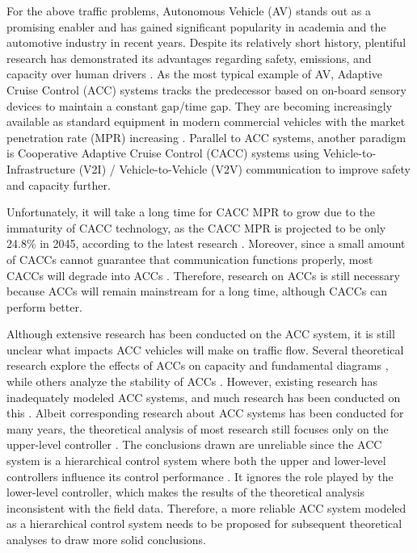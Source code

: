 \documentclass[journal]{IEEEtran}
\begin{document}
For the above traffic problems, Autonomous Vehicle (AV) stands out as a promising enabler and has gained significant popularity in academia and the automotive industry in recent years. Despite its relatively short history, plentiful research has demonstrated its advantages regarding safety, emissions, and capacity over human drivers \citep{Wang2019,Sarker2019,Dey2015}. As the most typical example of AV, Adaptive Cruise Control (ACC) systems tracks the predecessor based on on-board sensory devices to maintain a constant gap/time gap. They are becoming increasingly available as standard equipment in modern commercial vehicles with the market penetration rate (MPR) increasing \citep{Wilson2011}. Parallel to ACC systems, another paradigm is Cooperative Adaptive Cruise Control (CACC) systems using Vehicle-to-Infrastructure (V2I) / Vehicle-to-Vehicle (V2V) communication to improve safety and capacity further.

Unfortunately, it will take a long time for CACC MPR to grow due to the immaturity of CACC technology, as the CACC MPR is projected to be only 24.8\% in 2045, according to the latest research \citep{Bansal2017}. Moreover, since a small amount of CACCs cannot guarantee that communication functions properly, most CACCs will degrade into ACCs \citep{Wang2018,Ruan2021,Zhou2021}. Therefore, research on ACCs is still necessary because ACCs will remain mainstream for a long time, although CACCs can perform better.

Although extensive research has been conducted on the ACC system, it is still unclear what impacts ACC vehicles will make on traffic flow. Several theoretical research explore the effects of ACCs on capacity and fundamental diagrams \citep{Shang2021,Li2022,Ciuffo2021}, while others analyze the stability of ACCs \citep{Flores2018,Lee2021,Zhou2017}. However, existing research has inadequately modeled ACC systems, and much research has been conducted on this \citep{Gunter2019,Shang2022,Milanes2014}. Albeit corresponding research about ACC systems has been conducted for many years, the theoretical analysis of most research still focuses only on the upper-level controller \citep{Zhou2021,jiaEnhancedCooperativeCarfollowing2016,ruanImpactsInformationFlow2022}. The conclusions drawn are unreliable since the ACC system is a hierarchical control system where both the upper and lower-level controllers influence its control performance \citep{Rajamani2011}. It ignores the role played by the lower-level controller, which makes the results of the theoretical analysis inconsistent with the field data. Therefore, a more reliable ACC system modeled as a hierarchical control system needs to be proposed for subsequent theoretical analyses to draw more solid conclusions.
\end{document}
